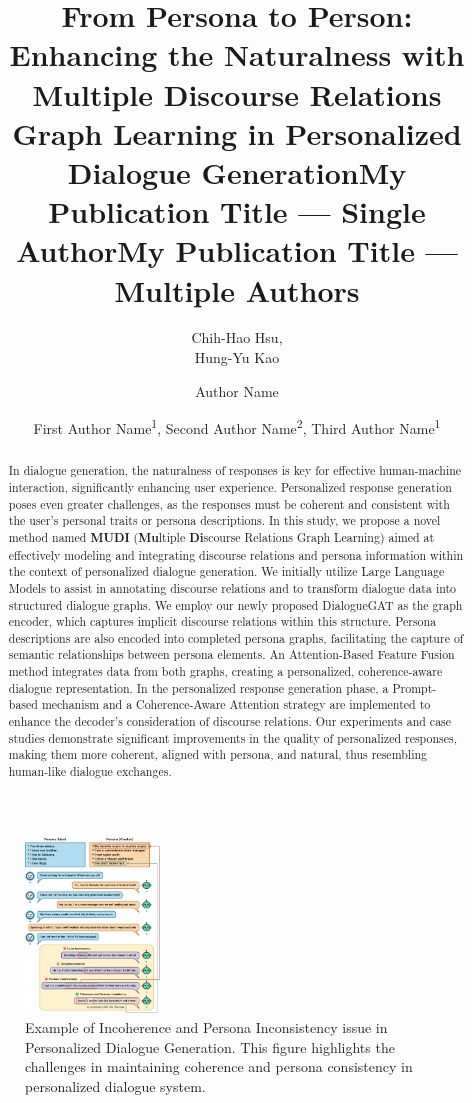 \documentclass[letterpaper]{article} %
\title{From Persona to Person: Enhancing the Naturalness with Multiple Discourse Relations Graph Learning in Personalized Dialogue Generation}
\author{
    Chih-Hao Hsu, \\
    Hung-Yu Kao
}
\title{My Publication Title --- Single Author}
\author {
    Author Name
}
\title{My Publication Title --- Multiple Authors}
\author {
    First Author Name\textsuperscript{\rm 1},
    Second Author Name\textsuperscript{\rm 2},
    Third Author Name\textsuperscript{\rm 1}
}
\begin{document}
\maketitle

\begin{abstract}
In dialogue generation, the naturalness of responses is key for effective human-machine interaction, significantly enhancing user experience. Personalized response generation poses even greater challenges, as the responses must be coherent and consistent with the user's personal traits or persona descriptions. In this study, we propose a novel method named \textbf{MUDI} (\textbf{Mu}ltiple \textbf{Di}scourse Relations Graph Learning) aimed at effectively modeling and integrating discourse relations and persona information within the context of personalized dialogue generation. We initially utilize Large Language Models to assist in annotating discourse relations and to transform dialogue data into structured dialogue graphs. We employ our newly proposed DialogueGAT as the graph encoder, which captures implicit discourse relations within this structure. Persona descriptions are also encoded into completed persona graphs, facilitating the capture of semantic relationships between persona elements. An Attention-Based Feature Fusion method integrates data from both graphs, creating a personalized, coherence-aware dialogue representation. In the personalized response generation phase, a Prompt-based mechanism and a Coherence-Aware Attention strategy are implemented to enhance the decoder's consideration of discourse relations. Our experiments and case studies demonstrate significant improvements in the quality of personalized responses, making them more coherent, aligned with persona, and natural, thus resembling human-like dialogue exchanges.
\end{abstract}

%

\begin{figure}[ht]
    \centering
    \includegraphics[width=0.32\textwidth]{./images/intro_pdg.png}
    \caption{Example of Incoherence and Persona Inconsistency issue in Personalized Dialogue Generation. This figure highlights the challenges in maintaining coherence and persona consistency in personalized dialogue system.}
    \label{fig:intro_pdg}
\end{figure}
\end{document}
